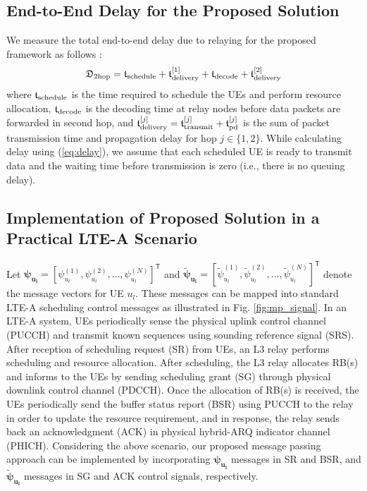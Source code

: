 \documentclass[twocolumn,10pt]{IEEEtran}
\begin{document}
\subsection{End-to-End Delay for the Proposed Solution}


We measure the total end-to-end delay due to relaying for the proposed framework as follows \cite{delay_imt}:
\begin{equation} \label{eq:delay}
\mathfrak{D}_{\rm 2 hop} = \mathfrak{t}_{\rm schedule} + \mathfrak{t}_{\rm delivery}^{[1]} + \mathfrak{t}_{\rm decode}  + \mathfrak{t}_{\rm delivery}^{[2]}
\end{equation}
where  $\mathfrak{t}_{\rm schedule}$ is the time required to schedule the UEs and perform resource allocation, $\mathfrak{t}_{\rm decode}$ is the decoding time at relay nodes before data packets are forwarded in second hop, and $\mathfrak{t}_{\rm delivery}^{[j]} = \mathfrak{t}_{\rm transmit}^{[j]} + \mathfrak{t}_{\rm pd}^{[j]}$ is the sum of packet transmission time and propagation delay for hop $j \in \lbrace 1,2 \rbrace$. While calculating delay using  (\ref{eq:delay}), we assume that each scheduled UE is ready to transmit data and the waiting time before transmission is zero (i.e., there is no queuing delay).

\subsection{Implementation of Proposed Solution in a Practical LTE-A Scenario}

Let $\boldsymbol{\psi_{u_l}} = \left[ \psi_{u_l}^{(1)}, \psi_{u_l}^{(2)}, \ldots, \psi_{u_l}^{(N)}\right]^\mathsf{T}$ and $\boldsymbol{\tilde{\psi}_{u_l}} = \left[ \tilde{\psi}_{u_l}^{(1)}, \tilde{\psi}_{u_l}^{(2)}, \ldots, \tilde{\psi}_{u_l}^{(N)} \right]^\mathsf{T}$ denote the  message vectors for UE $u_l$. These messages can be mapped into standard LTE-A scheduling control messages as illustrated in Fig. \ref{fig:mp_signal}. In an LTE-A system, UEs periodically sense the physical uplink control channel (PUCCH) and transmit known sequences using sounding reference signal (SRS). After reception of scheduling request (SR) from UEs, an L3 relay performs scheduling and resource allocation. After scheduling, the L3 relay allocates RB(s) and informs to the UEs by sending scheduling grant (SG) through  physical downlink control channel (PDCCH). Once the allocation of RB(s) is received, the UEs periodically send the buffer status report (BSR) using PUCCH to the relay in order to update the resource requirement, and in response, the relay sends back an acknowledgment (ACK) in physical hybrid-ARQ indicator channel (PHICH). Considering the above scenario, our proposed message passing approach can be implemented by incorporating $\boldsymbol{\psi_{u_l}}$ messages in SR and BSR, and $\boldsymbol{\tilde{\psi}_{u_l}}$ messages in SG and ACK control signals, respectively.
\end{document}
